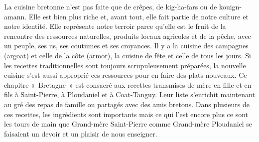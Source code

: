 La cuisine bretonne n’est pas faite que de crêpes, de kig-ha-fars ou de kouign-amann. Elle est bien plus riche et, avant tout, elle fait partie de notre culture et notre identité. Elle représente notre terroir parce qu’elle est le fruit de la rencontre des ressources naturelles, produits locaux agricoles et de la pêche, avec un peuple, ses us, ses coutumes et ses croyances. Il y a la cuisine des campagnes (argoat) et celle de la côte (armor), la cuisine de fête et celle de tous les jours. Si les recettes traditionnelles sont toujours scrupuleusement préparées, la nouvelle cuisine s’est aussi approprié ces ressources pour en faire des plats nouveaux.
Ce chapitre « Bretagne » est consacré aux recettes transmises de mère en fille et en fils à Saint-Pierre, à Ploudaniel et à Coat-Tanguy. Leur liste s’enrichit maintenant au gré des repas de famille ou partagés avec des amis bretons. Dans plusieurs de ces recettes, les ingrédients sont importants mais ce qui l’est encore plus ce sont les tours de main que Grand-mère Saint-Pierre comme Grand-mère Ploudaniel se faisaient un devoir et un plaisir de nous enseigner.
